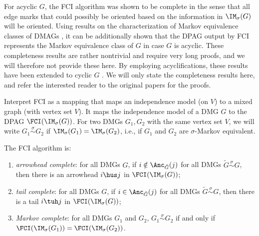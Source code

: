 For acyclic $G$, the FCI algorithm was shown to be complete \cite{Zhang2008_AI} in the sense that all edge marks that could possibly be oriented based on the information in $\IM_\sigma(G)$ will be oriented.
Using results on the characterization of Markov equivalence classes of DMAGs \cite{Ali++2005}, it can be additionally shown that the DPAG output by FCI represents the Markov equivalence class of $G$ in case $G$ is acyclic.
These completeness results are rather nontrivial and require very long proofs, and we will therefore not provide these here.
By employing acyclifications, these results have been extended to cyclic $G$ \cite{MooijClaassen_UAI_20}.
We will only state the completeness results here, and refer the interested reader to the original papers for the proofs.

Interpret FCI as a mapping that maps an independence model (on $V$) to a mixed graph (with vertex set $V$).
It maps the independence model of a DMG $G$ to the DPAG $\FCI(\IM_\sigma(G))$.
For two DMGs $G_1,G_2$ with the same vertex set $V$, we will write $G_1 \stackrel{\sigma}{\sim} G_2$ if $\IM_\sigma(G_1) = \IM_\sigma(G_2)$, i.e., if $G_1$ and $G_2$ are $\sigma$-Markov equivalent.
\begin{Thm}\label{thm:fci_sound_complete}
The FCI algorithm is:
  \begin{enumerate}[label=(\roman*)]
    \item \emph{arrowhead complete}: for all DMGs $G$, if $i \notin \Anc_{\tilde{G}}(j)$ for all DMGs $\tilde{G} \stackrel{\sigma}{\sim} G$, then there is an arrowhead $i \hus j$ in $\FCI(\IM_\sigma(G))$;
    \item \emph{tail complete}: for all DMGs $G$, if $i \in \Anc_{\tilde{G}}(j)$ for all DMGs $\tilde{G} \stackrel{\sigma}{\sim} G$, then there is a tail $i \tuh j$ in $\FCI(\IM_\sigma(G))$;
    \item \emph{Markov complete}: for all DMGs $G_1$ and $G_2$, $G_1 \stackrel{\sigma}{\sim} G_2$ if and only if $\FCI(\IM_\sigma(G_1)) = \FCI(\IM_\sigma(G_2))$.
  \end{enumerate}
\end{Thm}
